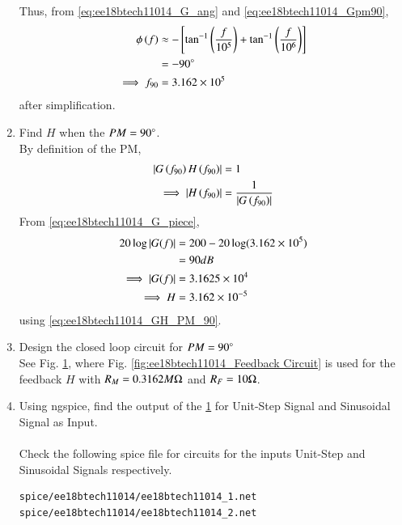 \begin{enumerate}[label=\thesection.\arabic*.,ref=\thesection.\theenumi]
Thus, from  \eqref{eq:ee18btech11014_G_ang} and \eqref{eq:ee18btech11014_Gpm90},
%
\begin{align}
\phi\left(f\right) &\approx
-{}\left[\tan ^{-1}\left(\frac{f}{10^{5}}\right)+\tan ^{-1}\left(\frac{f}{10^{6}}\right)\right]
\\
&= -90 \degree
\\
\implies f_{90} &= 3.162 \times 10^{5}
\end{align}
after simplification.
\item Find $H$ when the $PM = 90 \degree$.
\\
\solution By definition of the PM, 
\begin{align}
\left\vert G\left(f_{90}\right)H\left(f_{90}\right)\right\vert &=1
\\
\implies \left\vert H\left(f_{90}\right)\right\vert &=\frac{1}{\left\vert G\left(f_{90}\right)\right\vert}
\label{eq:ee18btech11014_GH_PM_90}
\end{align}
%
From \eqref{eq:ee18btech11014_G_piece},
\begin{align}
20 \log \left\vert G(f)\right\vert &= 200 - 20\log(3.162 \times 10^{5})\\
&= 90 dB \\
\implies \left\vert G(f)\right\vert &= 3.1625 \times 10^{4}
\\
\implies H &= 3.162 \times 10^{-5}
\end{align}
using \eqref{eq:ee18btech11014_GH_PM_90}.
\item Design the closed loop circuit for $PM = 90 \degree$
\\
\solution See Fig. 	\ref{fig:ee18btech11014_Closed-Loop Circuit alpha=90}, where Fig. 	\ref{fig:ee18btech11014_Feedback Circuit} is used for the feedback $H$ with $R_M = 0.3162 M \ohm$ and 	$R_F = 10 \ohm$.

\begin{figure}[ht!]
	\begin{center}
		\resizebox{\columnwidth}{!}{}
	\end{center}
	\caption{}
	\label{fig:ee18btech11014_Closed-Loop Circuit alpha=90}
\end{figure}

\item Using ngspice, find the output of the \ref{fig:ee18btech11014_Closed-Loop Circuit alpha=90} for Unit-Step Signal and Sinusoidal Signal as Input.\\
\solution\\
Check the following spice file for circuits for the inputs Unit-Step and Sinusoidal Signals respectively.
\begin{lstlisting}
spice/ee18btech11014/ee18btech11014_1.net
spice/ee18btech11014/ee18btech11014_2.net
\end{lstlisting}


\end{enumerate}
